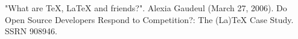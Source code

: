 "What are TeX, LaTeX and friends?".
Alexia Gaudeul (March 27, 2006). Do Open Source Developers Respond to Competition?: The (La)TeX Case Study. SSRN 908946.
